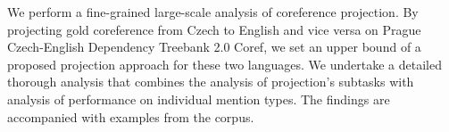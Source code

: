 We perform a fine-grained large-scale analysis of coreference projection. By projecting gold coreference from Czech to English and vice versa on Prague Czech-English Dependency Treebank 2.0 Coref, we set an upper bound of a proposed projection approach for these two languages. We undertake a detailed thorough analysis that combines the analysis of projection's subtasks with analysis of performance on individual mention types. The findings are accompanied with examples from the corpus.
